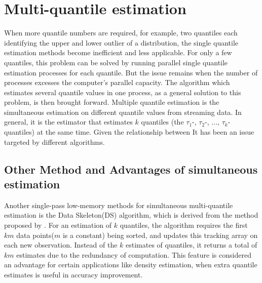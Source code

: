 
\section{Multi-quantile estimation}
\label{multiquantile}
When more quantile numbers are required, for example, two quantiles each identifying the upper and lower outlier of a distribution, the single quantile estimation methods become inefficient and less applicable.
For only a few quantiles, this problem can be solved by running parallel single quantile estimation processes for each quantile. But the issue remains when the number of processes excesses the computer's parallel capacity.
The algorithm which estimates several quantile values in one process, as a general solution to this problem, is then brought forward.
Multiple quantile estimation is the simultaneous estimation on different quantile values from streaming data. 
In general, it is the estimator that estimates $k$ quantiles (the $\tau_1$-, $\tau_2$-, $...$, $\tau_k$-quantiles) at the same time.
Given the relationship between 
It has been an issue targeted by different algorithms.
    \subsection{Other Method and Advantages of simultaneous estimation\cite{mcdermottDataSkeletonsSimultaneous2007}}

    Another single-pass low-memory methods for simultaneous multi-quantile estimation is the Data Skeleton(DS)\cite{mcdermottDataSkeletonsSimultaneous2007} algorithm, which is derived from the method proposed by \citeauthor{liechtySinglepassLowstorageArbitrary} \cite{liechtySinglepassLowstorageArbitrary}. For an estimation of $k$ quantiles, the algorithm requires the first $km$ data points($m$ is a constant) being sorted, and updates this tracking array on each new observation. Instead of the $k$ estimates of quantiles, it returns a total of $km$ estimates due to the redundancy of computation. This feature is considered an advantage for certain applications like density estimation, when extra quantile estimates is useful in accuracy improvement.


